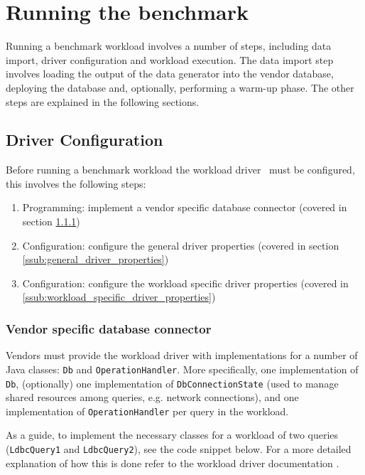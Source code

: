 \section{Running the benchmark}

Running a benchmark workload involves a number of steps, including data import, driver configuration and workload execution.
The data import step involves loading the output of the data generator into the vendor database,
deploying the database and, optionally, performing a warm-up phase. 
The other steps are explained in the following sections.

\subsection{Driver Configuration} 
\label{sub:driver_configuration}

Before running a benchmark workload the workload driver~\cite{test_driver} must be configured, this involves the following steps:
\begin{enumerate}
	\item Programming: implement a vendor specific database connector (covered in section \ref{ssub:vendor_specific_database_connector})
	\item Configuration: configure the general driver properties (covered in section \ref{ssub:general_driver_properties})
	\item Configuration: configure the workload specific driver properties (covered in \ref{ssub:workload_specific_driver_properties})
\end{enumerate}

\subsubsection{Vendor specific database connector} 
\label{ssub:vendor_specific_database_connector}
Vendors must provide the workload driver with implementations for a number of Java classes: \texttt{Db} and \texttt{OperationHandler}.
More specifically, one implementation of \texttt{Db}, 
(optionally) one implementation of \texttt{DbConnectionState} (used to manage shared resources among queries, e.g. network connections), 
and one implementation of \texttt{OperationHandler} per query in the workload.

As a guide, to implement the necessary classes for a workload of two queries (\texttt{LdbcQuery1} and \texttt{LdbcQuery2}), 
see the code snippet below.
For a more detailed explanation of how this is done refer to the workload driver documentation \cite{test_driver}.

